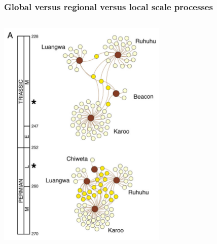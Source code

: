 \documentclass{beamer} \usepackage{amsmath,amsthm}
\begin{document}
\begin{frame}
  \frametitle{Global versus regional versus local scale processes}

  \begin{columns}
    \begin{column}{0.55\textwidth}
      \includegraphics[height=0.7\textheight,width=\textwidth,keepaspectratio=true]{figure/permian}


\end{column}
\end{columns}
\end{frame}
\end{document}
